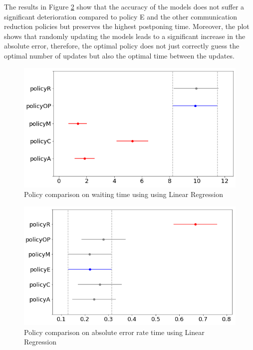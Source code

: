\documentclass{mpaper}
\begin{document}
The results in Figure \ref{fig:lin_reg_pi3_error_plot_diff_means} show that the accuracy of the models does not suffer a significant deterioration compared to policy E and the other communication reduction policies but preserves the highest postponing time. Moreover, the plot shows that randomly updating the models leads to a significant increase in the absolute error, therefore, the optimal policy does not just correctly guess the optimal number of updates but also the optimal time between the updates. 
\begin{figure}[h]
    \centering
    \includegraphics[scale=0.35]{imgs/lin_reg_pi3_waiting_plot_diff_means.png}
    \caption{Policy comparison on waiting time using using Linear Regression}
    \label{fig:lin_reg_pi3_waiting_plot_diff_means}
\end{figure}
\begin{figure}[h]
    \centering
    \includegraphics[scale=0.35]{imgs/lin_reg_pi3_error_plot_diff_means.png}
    \caption{Policy comparison on absolute error rate time using Linear Regression}
    \label{fig:lin_reg_pi3_error_plot_diff_means}
\end{figure}
\end{document}
